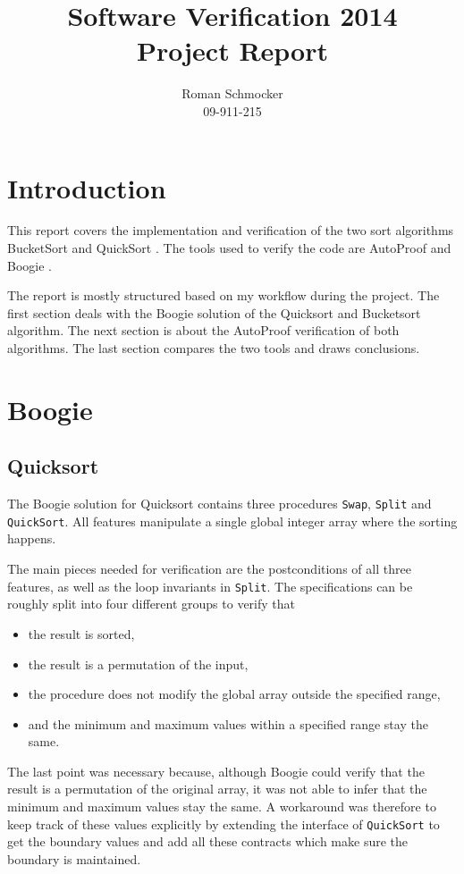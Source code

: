 \documentclass[a4paper,10pt]{article}
\title{Software Verification 2014 \\ Project Report}
\author{Roman Schmocker \\ 09-911-215}
\begin{document}
\maketitle


\section{Introduction}
This report covers the implementation and verification of the two sort algorithms BucketSort \cite{web:bucketsort} and QuickSort \cite{web:quicksort}.
The tools used to verify the code are AutoProof \cite{web:autoproof} and Boogie \cite{paper:boogie, web:boogie}.

The report is mostly structured based on my workflow during the project.
The first section deals with the Boogie solution of the Quicksort and Bucketsort algorithm.
The next section is about the AutoProof verification of both algorithms.
The last section compares the two tools and draws conclusions.

\section {Boogie}

\subsection {Quicksort}

The Boogie solution for Quicksort contains three procedures \lstinline!Swap!, \lstinline!Split! and \lstinline!QuickSort!.
All features manipulate a single global integer array where the sorting happens.

The main pieces needed for verification are the postconditions of all three features, as well as the loop invariants in \lstinline!Split!.
The specifications can be roughly split into four different groups to verify that
\begin{itemize}
 \item the result is sorted, 
 \item the result is a permutation of the input,
 \item the procedure does not modify the global array outside the specified range,
 \item and the minimum and maximum values within a specified range stay the same.
\end{itemize}

The last point was necessary because, although Boogie could verify that the result is a permutation of the original array,
it was not able to infer that the minimum and maximum values stay the same.
A workaround was therefore to keep track of these values explicitly by extending the interface of \lstinline!QuickSort! to get the boundary values
and add all these contracts which make sure the boundary is maintained.
\end{document}
